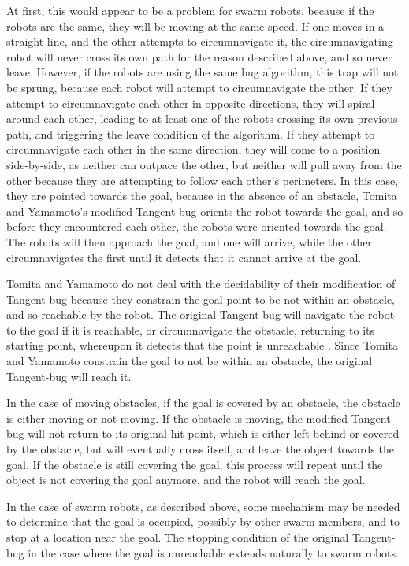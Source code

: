 At first, this would appear to be a problem for swarm robots, because if the robots are the same, they will be moving at the same speed. 
If one moves in a straight line, and the other attempts to circumnavigate it, the circumnavigating robot will never cross its own path for the reason described above, and so never leave. 
However, if the robots are using the same bug algorithm, this trap will not be sprung, because each robot will attempt to circumnavigate the other. 
If they attempt to circumnavigate each other in opposite directions, they will spiral around each other, leading to at least one of the robots crossing its own previous path, and triggering the leave condition of the algorithm. 
If they attempt to circumnavigate each other in the same direction, they will come to a position side-by-side, as neither can outpace the other, but neither will pull away from the other because they are attempting to follow each other's perimeters. 
In this case, they are pointed towards the goal, because in the absence of an obstacle, Tomita and Yamamoto's modified Tangent-bug orients the robot towards the goal, and so before they encountered each other, the robots were oriented towards the goal.
The robots will then approach the goal, and one will arrive, while the other circumnavigates the first until it detects that it cannot arrive at the goal. 

Tomita and Yamamoto do not deal with the decidability of their modification of Tangent-bug because they constrain the goal point to be not within an obstacle, and so reachable by the robot. The original Tangent-bug will navigate the robot to the goal if it is reachable, or circumnavigate the obstacle, returning to its starting point, whereupon it detects that the point is unreachable \citep{kamon1998tangentbug}. Since Tomita and Yamamoto constrain the goal to not be within an obstacle, the original Tangent-bug will reach it. 

In the case of moving obstacles, if the goal is covered by an obstacle, the obstacle is either moving or not moving. If the obstacle is moving, the modified Tangent-bug will not return to its original hit point, which is either left behind or covered by the obstacle, but will eventually cross itself, and leave the object towards the goal.
If the obstacle is still covering the goal, this process will repeat until the object is not covering the goal anymore, and the robot will reach the goal. 

In the case of swarm robots, as described above, some mechanism may be needed to determine that the goal is occupied, possibly by other swarm members, and to stop at a location near the goal. 
The stopping condition of the original Tangent-bug in the case where the goal is unreachable extends naturally to swarm robots. 

